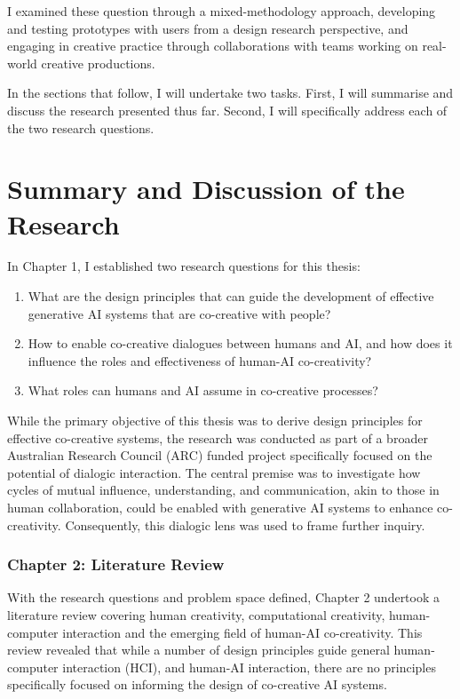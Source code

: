 I examined these question through a mixed-methodology approach, developing and testing prototypes with users from a design research perspective, and engaging in creative practice through collaborations with teams working on real-world creative productions.

In the sections that follow, I will undertake two tasks. First, I will summarise and discuss the research presented thus far. Second, I will specifically address each of the two research questions.  

\section{Summary and Discussion of the Research}

In Chapter 1, I established two research questions for this thesis:

\begin{enumerate}
    \item What are the design principles that can guide the development of effective generative AI systems that are co-creative with people?
    \item \begin{highlight}How to enable co-creative dialogues between humans and AI, and how does it influence the roles and effectiveness of human-AI co-creativity?\end{highlight}
    \item What roles can humans and AI assume in co-creative processes?
\end{enumerate}

While the primary objective of this thesis was to derive design principles for effective co-creative systems, the research was conducted as part of a broader Australian Research Council (ARC) funded project specifically focused on the potential of dialogic interaction. The central premise was to investigate how cycles of mutual influence, understanding, and communication, akin to those in human collaboration, could be enabled with generative AI systems to enhance co-creativity. Consequently, this dialogic lens was used to frame further inquiry.

\subsubsection{\textbf{Chapter 2: Literature Review}}

With the research questions and problem space defined, Chapter 2 undertook a literature review covering human creativity, computational creativity, human-computer interaction and the emerging field of human-AI co-creativity. This review revealed that while a number of design principles guide general human-computer interaction (HCI), and human-AI interaction, there are no principles specifically focused on informing the design of co-creative AI systems.

